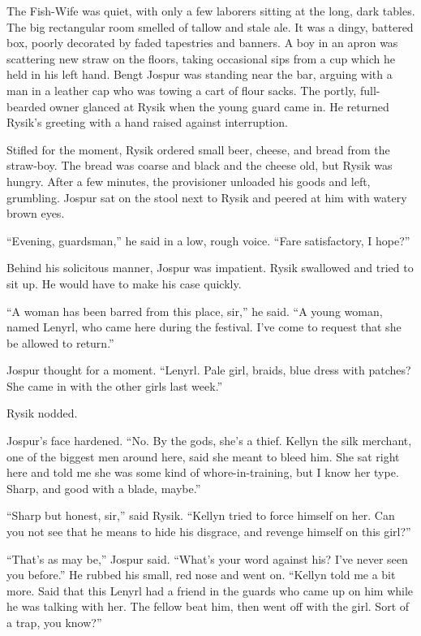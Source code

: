 \documentclass[10pt,b5paper]{article}
\begin{document}
The Fish-Wife was quiet, with only a few laborers sitting at the
long, dark tables. The big rectangular room smelled of tallow and
stale ale. It was a dingy, battered box, poorly decorated by faded
tapestries and banners. A boy in an apron was scattering new straw
on the floors, taking occasional sips from a cup which he held in his
left hand. Bengt Jospur was standing near the bar, arguing with a man
in a leather cap who was towing a cart of flour sacks. The portly,
full-bearded owner glanced at Rysik when the young guard came in. He
returned Rysik's greeting with a hand raised against interruption.

Stifled for the moment, Rysik ordered small beer, cheese, and bread
from the straw-boy. The bread was coarse and black and the cheese
old, but Rysik was hungry. After a few minutes, the provisioner
unloaded his goods and left, grumbling. Jospur sat on the stool
next to Rysik and peered at him with watery brown eyes.

``Evening, guardsman,'' he said in a low, rough voice. ``Fare
satisfactory, I hope?''

Behind his solicitous manner, Jospur was impatient. Rysik swallowed
and tried to sit up. He would have to make his case quickly.

``A woman has been barred from this place, sir,'' he said. ``A young
woman, named Lenyrl, who came here during the festival. I've come
to request that she be allowed to return.''

Jospur thought for a moment. ``Lenyrl. Pale girl, braids, blue dress
with patches? She came in with the other girls last week.''

Rysik nodded.

Jospur's face hardened. ``No. By the gods, she's a thief. Kellyn
the silk merchant, one of the biggest men around here, said she
meant to bleed him. She sat right here and told me she was some
kind of whore-in-training, but I know her type. Sharp, and good
with a blade, maybe.''

``Sharp but honest, sir,'' said Rysik. ``Kellyn tried to force himself
on her. Can you not see that he means to hide his disgrace, and
revenge himself on this girl?''

``That's as may be,'' Jospur said. ``What's your word against his? I've
never seen you before.'' He rubbed his small, red nose and went on.
``Kellyn told me a bit more. Said that this Lenyrl had a friend in the
guards who came up on him while he was talking with her. The fellow
beat him, then went off with the girl. Sort of a trap, you know?''
\end{document}
